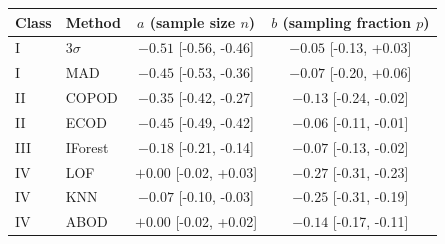 \begin{tabular}{llcc}
\hline
\textbf{Class} & \textbf{Method} & $a$ (sample size $n$) & $b$ (sampling fraction $p$) \\
\hline
I & $3\sigma$ & $-0.51$ [-0.56, -0.46] & $-0.05$ [-0.13, +0.03] \\
I & MAD & $-0.45$ [-0.53, -0.36] & $-0.07$ [-0.20, +0.06] \\
II & COPOD & $-0.35$ [-0.42, -0.27] & $-0.13$ [-0.24, -0.02] \\
II & ECOD & $-0.45$ [-0.49, -0.42] & $-0.06$ [-0.11, -0.01] \\
III & IForest & $-0.18$ [-0.21, -0.14] & $-0.07$ [-0.13, -0.02] \\
IV & LOF & $+0.00$ [-0.02, +0.03] & $-0.27$ [-0.31, -0.23] \\
IV & KNN & $-0.07$ [-0.10, -0.03] & $-0.25$ [-0.31, -0.19] \\
IV & ABOD & $+0.00$ [-0.02, +0.02] & $-0.14$ [-0.17, -0.11] \\
\hline
\end{tabular}
